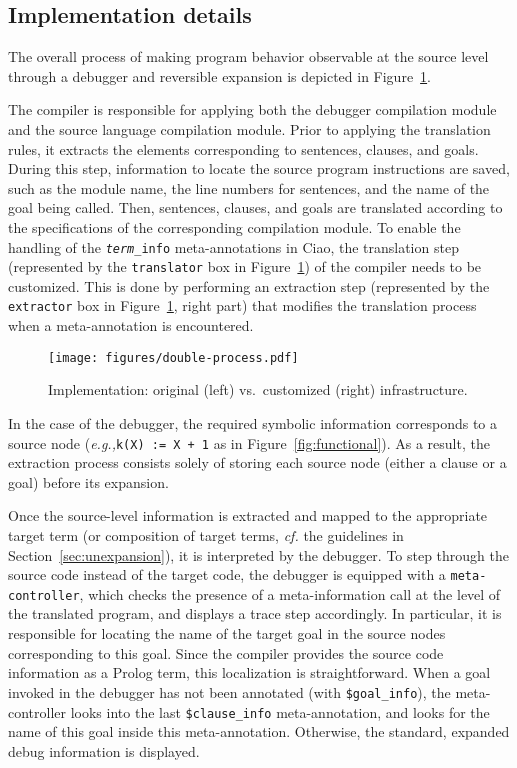 \documentclass[preprint]{llncs}
\newcommand{\eg}{\emph{e.g.,\xspace}}
\newcommand{\pre}[1]{\texttt{#1}}
\begin{document}
\subsection{Implementation details}

The overall process of making program behavior observable at the
source level through a debugger and reversible expansion is depicted
in Figure~\ref{fig:double-process}.

The compiler is responsible for applying both the debugger compilation
module and the source language compilation module. Prior to applying
the translation rules, it extracts the elements corresponding to
sentences, clauses, and goals. During this step, information to locate
the source program instructions are saved, such as the module name,
the line numbers for sentences, and the name of the goal being called.
Then, sentences, clauses, and goals are translated according to the
specifications of the corresponding compilation module. To enable the
handling of the \pre{\emph{term}\_info} meta-annotations in Ciao, the
translation step (represented by the \pre{translator} box in
Figure~\ref{fig:double-process}) of the compiler needs to be
customized. This is done by performing an extraction step (represented
by the \pre{extractor} box in Figure~\ref{fig:double-process}, right
part) that modifies the translation process when a meta-annotation is
encountered.

\begin{figure}[t!]
    \centering
    \texttt{[image: figures/double-process.pdf]}
    \caption{Implementation: original (left) vs.\ customized (right)
    infrastructure.}
    \label{fig:double-process}
\end{figure}


In the case of the debugger, the required symbolic information
corresponds to a source node (\eg \pre{k(X) := X + 1} as in
Figure~\ref{fig:functional}). As a result, the extraction process
consists solely of storing each source node (either a clause or a
goal) before its expansion.

Once the source-level information is extracted and mapped to the
appropriate target term (or composition of target terms, \emph{cf.}
the guidelines in Section~\ref{sec:unexpansion}), it is interpreted by
the debugger. To step through the source code instead of the target
code, the debugger is equipped with a \pre{meta-controller}, which
checks the presence of a meta-information call at the level 
of the translated program, and displays a trace
step accordingly. In particular, it is responsible for locating the
name of the target goal in the source nodes corresponding to this
goal. Since the compiler provides the source code information as a
Prolog term, this localization is straightforward. When a goal invoked
in the debugger has not been annotated (with
\pre{\$goal\_info}), the meta-controller looks into the last \pre{\$clause\_info}
meta-annotation, and looks for the name of this goal inside this
meta-annotation. Otherwise, the standard, expanded debug information
is displayed.
 
\end{document}
